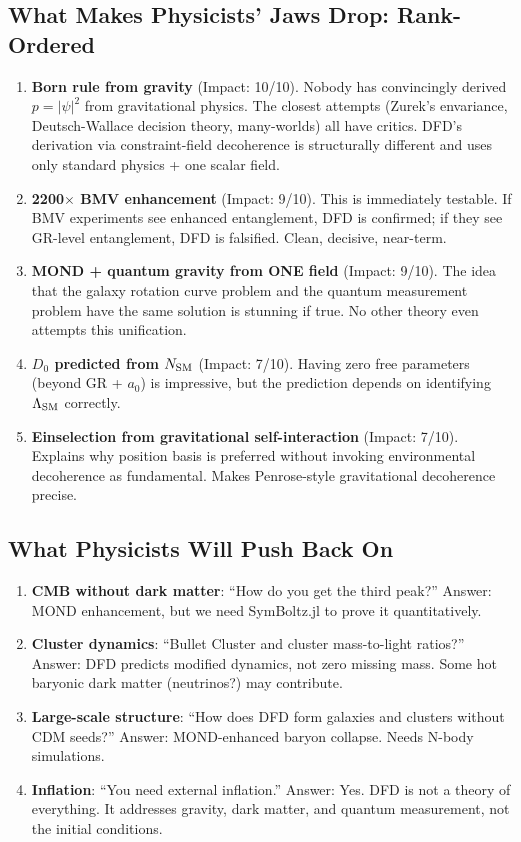 \documentclass[11pt,a4paper]{article}
\begin{document}
\subsection{What Makes Physicists' Jaws Drop: Rank-Ordered}

\begin{enumerate}
\item \textbf{Born rule from gravity} (Impact: 10/10). Nobody has convincingly derived $p = |\psi|^2$ from gravitational physics. The closest attempts (Zurek's envariance, Deutsch-Wallace decision theory, many-worlds) all have critics. DFD's derivation via constraint-field decoherence is structurally different and uses only standard physics + one scalar field.

\item \textbf{2200$\times$ BMV enhancement} (Impact: 9/10). This is immediately testable. If BMV experiments see enhanced entanglement, DFD is confirmed; if they see GR-level entanglement, DFD is falsified. Clean, decisive, near-term.

\item \textbf{MOND + quantum gravity from ONE field} (Impact: 9/10). The idea that the galaxy rotation curve problem and the quantum measurement problem have the same solution is stunning if true. No other theory even attempts this unification.

\item \textbf{$D_0$ predicted from $N_{\rm SM}$} (Impact: 7/10). Having zero free parameters (beyond GR + $a_0$) is impressive, but the prediction depends on identifying $\Lambda_{\rm SM}$ correctly.

\item \textbf{Einselection from gravitational self-interaction} (Impact: 7/10). Explains why position basis is preferred without invoking environmental decoherence as fundamental. Makes Penrose-style gravitational decoherence precise.
\end{enumerate}

\subsection{What Physicists Will Push Back On}

\begin{enumerate}
\item \textbf{CMB without dark matter}: ``How do you get the third peak?'' Answer: MOND enhancement, but we need SymBoltz.jl to prove it quantitatively.
\item \textbf{Cluster dynamics}: ``Bullet Cluster and cluster mass-to-light ratios?'' Answer: DFD predicts modified dynamics, not zero missing mass. Some hot baryonic dark matter (neutrinos?) may contribute.
\item \textbf{Large-scale structure}: ``How does DFD form galaxies and clusters without CDM seeds?'' Answer: MOND-enhanced baryon collapse. Needs N-body simulations.
\item \textbf{Inflation}: ``You need external inflation.'' Answer: Yes. DFD is not a theory of everything. It addresses gravity, dark matter, and quantum measurement, not the initial conditions.
\end{enumerate}
\end{document}
